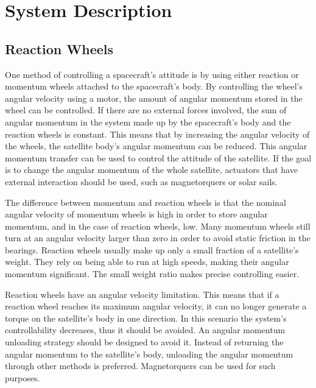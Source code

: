 \chapter{System Description}\label{chap:systemDescribtion}

\section{Reaction Wheels}

One method of controlling a spacecraft's attitude is by using either reaction or momentum wheels attached to the spacecraft's body. By controlling the wheel's angular velocity using a motor, the amount of angular momentum stored in the wheel can be controlled. If there are no external forces involved, the sum of angular momentum in the system made up by the spacecraft's body and the reaction wheels is constant. This means that by increasing the angular velocity of the wheels, the satellite body's angular momentum can be reduced. This angular momentum transfer can be used to control the attitude of the satellite. If the goal is to change the angular momentum of the whole satellite, actuators that have external interaction should be used, such as magnetorquers or solar sails.

The difference between momentum and reaction wheels is that the nominal angular velocity of momentum wheels is high in order to store angular momentum, and in the case of reaction wheels, low. Many momentum wheels still turn at an angular velocity larger than zero in order to avoid static friction in the bearings. Reaction wheels usually make up only a small fraction of a satellite's weight. They rely on being able to run at high speeds, making their angular momentum significant. The small weight ratio makes precise controlling easier.




Reaction wheels have an angular velocity limitation. This means that if a reaction wheel reaches its maximum angular velocity, it can no longer generate a torque on the satellite's body in one direction. In this scenario the system's controllability decreases, thus it should be avoided. An angular momentum unloading strategy should be designed to avoid it. Instead of returning the angular momentum to the satellite's body, unloading the angular momentum through other methods is preferred. Magnetorquers can be used for such purposes.

